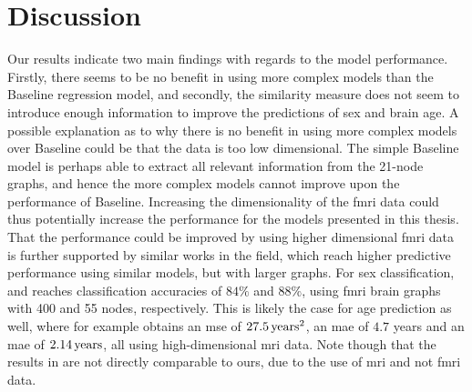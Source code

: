 \chapter{Discussion}
\label{chap:discussion}
    
Our results indicate two main findings with regards to the model performance. Firstly, there seems to be no benefit in using more complex models than the Baseline regression model, and secondly, the similarity measure does not seem to introduce enough information to improve the predictions of sex and brain age. A possible explanation as to why there is no benefit in using more complex models over Baseline could be that the data is too low dimensional. The simple Baseline model is perhaps able to extract all relevant information from the 21-node graphs, and hence the more complex models cannot improve upon the performance of Baseline. Increasing the dimensionality of the \acrshort{fmri} data could thus potentially increase the performance for the models presented in this thesis. That the performance could be improved by using higher dimensional \acrshort{fmri} data is further supported by similar works in the field, which reach higher predictive performance using similar models, but with larger graphs. For sex classification, \cite{arslan} and \cite{understanding_gnn} reaches classification accuracies of $84\%$ and $88\%$, using \acrshort{fmri} brain graphs with 400 and 55 nodes, respectively. This is likely the case for age prediction as well, where for example \cite{stankeviciute} obtains an \acrshort{mse} of $27.5\rm\,years^2$, \cite{amoroso_multiplex_age} an \acrshort{mae} of $4.7$ years and \cite{995_peng} an \acrshort{mae} of $2.14\rm\,years$, all using high-dimensional \acrshort{mri} data. Note though that the results in \cite{stankeviciute, amoroso_multiplex_age, 995_peng} are not directly comparable to ours, due to the use of \acrshort{mri} and not \acrshort{fmri} data.

